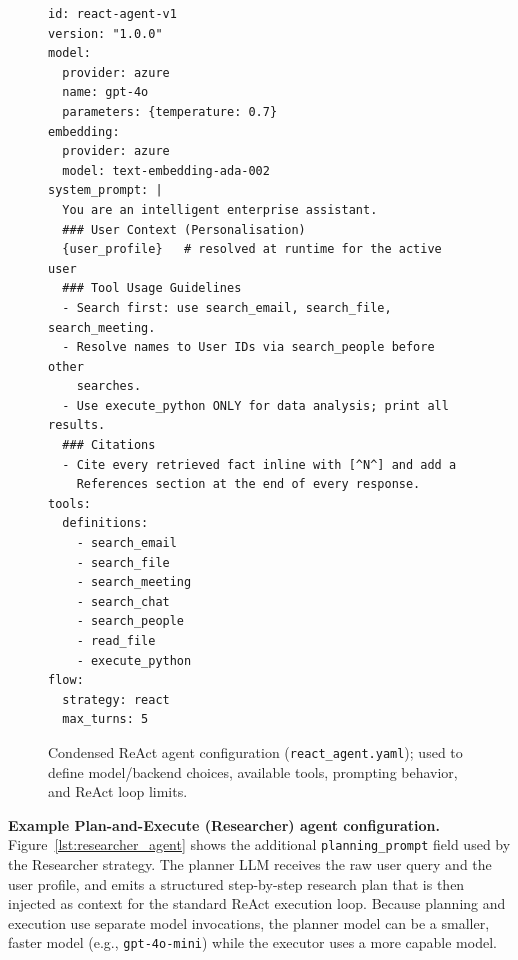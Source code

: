 \documentclass[journal,dvipsnames]{acmart}
\begin{document}
\begin{figure}[h]
  \centering
  
\begin{minipage}{0.9\textwidth}
\begin{lstlisting}
id: react-agent-v1
version: "1.0.0"
model:
  provider: azure
  name: gpt-4o
  parameters: {temperature: 0.7}
embedding:
  provider: azure
  model: text-embedding-ada-002
system_prompt: |
  You are an intelligent enterprise assistant.
  ### User Context (Personalisation)
  {user_profile}   # resolved at runtime for the active user
  ### Tool Usage Guidelines
  - Search first: use search_email, search_file, search_meeting.
  - Resolve names to User IDs via search_people before other
    searches.
  - Use execute_python ONLY for data analysis; print all results.
  ### Citations
  - Cite every retrieved fact inline with [^N^] and add a
    References section at the end of every response.
tools:
  definitions:
    - search_email
    - search_file
    - search_meeting
    - search_chat
    - search_people
    - read_file
    - execute_python
flow:
  strategy: react
  max_turns: 5
  \end{lstlisting}
\end{minipage}

  \caption{Condensed ReAct agent configuration (\texttt{react\_agent.yaml}); used to define model/backend choices, available tools, prompting behavior, and ReAct loop limits.}
  \label{lst:react_agent}
\end{figure}

\textbf{Example Plan-and-Execute (Researcher) agent configuration.}
Figure~\ref{lst:researcher_agent} shows the additional
\texttt{planning\_prompt} field used by the Researcher strategy.
The planner LLM receives the raw user query and the user profile, and
emits a structured step-by-step research plan that is then injected as
context for the standard ReAct execution loop.
Because planning and execution use separate model invocations, the
planner model can be a smaller, faster model (e.g., \texttt{gpt-4o-mini})
while the executor uses a more capable model.
\end{document}
